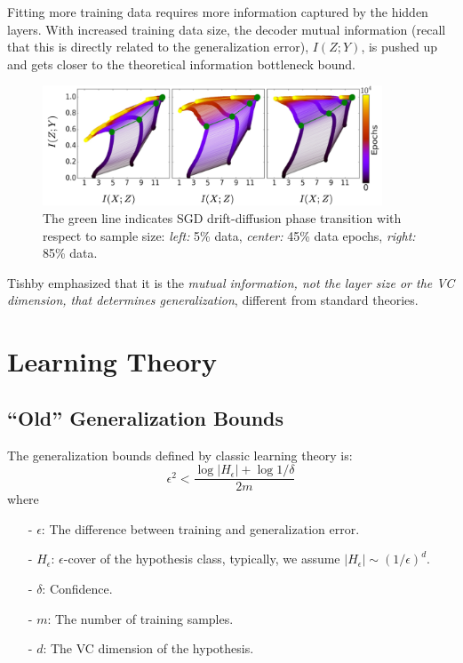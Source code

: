 \documentclass[11pt]{article}
\begin{document}
Fitting more training data requires more information captured by the hidden layers. With increased training data size, the decoder mutual information (recall that this is directly related to the generalization error), $I(Z;Y)$, is pushed up and gets closer to the theoretical information bottleneck bound.

\begin{figure}[H]
	\centering
	\includegraphics[width=0.9\textwidth]{sample}
	\caption{The green line indicates SGD drift-diffusion phase transition with respect to sample size: \emph{left:} 5\% data, \emph{center:} 45\% data epochs, \emph{right:} 85\% data.}
\end{figure}

Tishby emphasized that it is the \emph{mutual information, not the layer size or the VC dimension, that determines generalization}, different from standard theories.

\section{Learning Theory}

\subsection*{``Old'' Generalization Bounds}

The generalization bounds defined by classic learning theory is:
\begin{equation}
\epsilon^2 < \frac{\log \vert H_\epsilon \vert + \log 1/\delta}{2m}
\label{eq:bound}
\end{equation}
where
\begin{itemize}
	\item[-] $\epsilon$: The difference between training and generalization error.
	\item[-] $H_\epsilon$: $\epsilon$-cover of the hypothesis class, typically, we assume $\vert H_\epsilon \vert\sim (1/\epsilon)^d$.
	\item[-] $\delta$: Confidence.
	\item[-] $m$: The number of training samples.
	\item[-] $d$: The VC dimension of the hypothesis.
\end{itemize}
\end{document}
